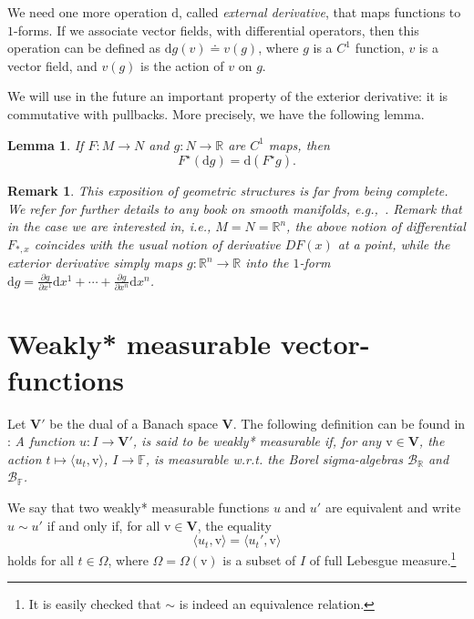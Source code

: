 \documentclass[sn-mathphys-num]{sn-jnl}
\numberwithin{equation}{section}
\theoremstyle{mythm}
\newtheorem{lemma}[proposition]{Lemma}
\theoremstyle{mydef}
\newtheorem{remark}[proposition]{Remark}
\newcommand{\R}{\mathbb{R}}
\begin{document}
  We need one more operation \( \mathrm{d} \), called \emph{external derivative}, that maps functions to \( 1 \)-forms.
  If we associate vector fields, with differential operators, then this operation can be defined as \( \mathrm{d}g(v) \doteq v(g)  \), where \( g \) is a \( C^1 \) function, \( v \) is a vector field, and \( v(g) \) is the action of \( v \) on \( g \).

  We will use in the future an important property of the exterior derivative: it is commutative with pullbacks.
  More precisely, we have the following lemma.
  \begin{lemma}\label{lem:commute}
  If \( F\colon M\to N \) and \( g\colon N\to \mathbb{R} \) are \( C^{1} \) maps, then
  \[
    F^\star(\mathrm{d}g) = \mathrm{d}(F^\star g).
  \]
\end{lemma}

\begin{remark}
  This exposition of geometric structures is far from being complete.
  We refer for further details to any book on smooth manifolds, e.g.,~\cite{novikovModernGeometricStructures2006}.
  Remark that in the case we are interested in, i.e., \( M=N= \mathbb{R}^n \), the above notion of differential \( F_{*,x} \) coincides with the usual notion of derivative \( DF(x) \) at a point, while the exterior derivative simply maps \( g\colon \mathbb{R}^n\to \mathbb{R} \) into the \( 1 \)-form \( \mathrm{d}g = \frac{\partial g}{\partial{x^1}}\mathrm{d} x^1 +\cdots + \frac{\partial g}{\partial{x^n}}\mathrm{d} x^n\).
\end{remark}

\section{Weakly* measurable vector-functions}\label{app:meas-w*}

Let $\bm V'$ be the dual of a Banach space $\bm V$. The following definition can be found in \cite[Section~II.1, Definition 1]{diestel1977vector}: 
\emph{A function $u\colon I \to \bm V'$, is said to be weakly* measurable if, for any $\mathrm v \in \bm V$, the action $t \mapsto \langle u_t, \mathrm  v\rangle$, $I \to \mathbb F$, is measurable w.r.t. the Borel 
sigma-algebras $\mathcal B_{\R}$ and $\mathcal B_{\mathbb F}$. } 

We say that two weakly* measurable functions $u$ and $u'$ are equivalent and write $u \sim u'$ if and only if, for all $\mathrm v \in \bm V$, the equality
\[
\langle u_t, \mathrm v\rangle = \langle u_t', \mathrm v\rangle
\]
holds for all $t \in \Omega$, where $\Omega = \Omega(\mathrm v)$ is a subset of $I$ of full Lebesgue measure.\footnote{It is easily checked that $\sim$ is indeed an equivalence relation.}
\end{document}
